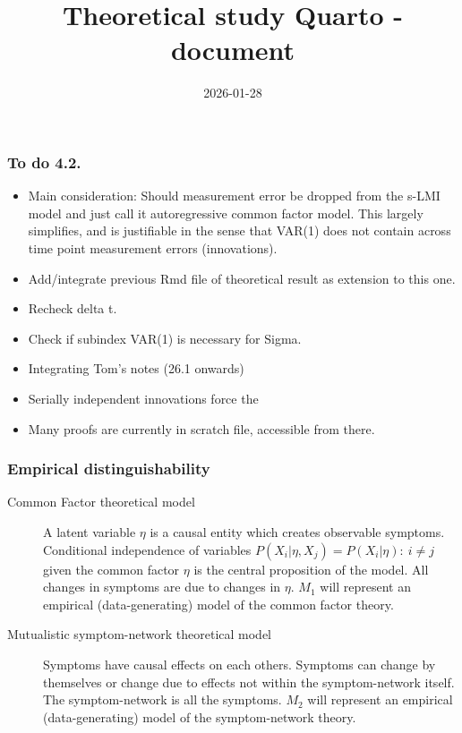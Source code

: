 \documentclass[
  letterpaper,
  DIV=11,
  numbers=noendperiod]{scrartcl}
\title{Theoretical study Quarto -document}
\author{}
\date{2026-01-28}
\begin{document}
\maketitle
\ifdefined\Shaded\renewenvironment{Shaded}{\begin{tcolorbox}[boxrule=0pt, enhanced, borderline west={3pt}{0pt}{shadecolor}, interior hidden, breakable, sharp corners, frame hidden]}{\end{tcolorbox}}\fi

\hypertarget{to-do-4.2.}{%
\subsubsection{To do 4.2.}\label{to-do-4.2.}}

\begin{itemize}
\item
  Main consideration: Should measurement error be dropped from the s-LMI
  model and just call it autoregressive common factor model. This
  largely simplifies, and is justifiable in the sense that VAR(1) does
  not contain across time point measurement errors (innovations).
\item
  Add/integrate previous Rmd file of theoretical result as extension to
  this one.
\item
  Recheck delta t.
\item
  Check if subindex VAR(1) is necessary for Sigma.
\item
  Integrating Tom's notes (26.1 onwards)
\item
  Serially independent innovations force the
\item
  Many proofs are currently in scratch file, accessible from there.
\end{itemize}

\hypertarget{empirical-distinguishability}{%
\subsubsection{Empirical
distinguishability}\label{empirical-distinguishability}}

\begin{description}
\item[Common Factor theoretical model]
A latent variable \(\eta\) is a causal entity which creates observable
symptoms. Conditional independence of variables
\(P(X_i|\eta,X_j)=P(X_i|\eta):\:i\ne j\) given the common factor
\(\eta\) is the central proposition of the model. All changes in
symptoms are due to changes in \(\eta\). \(M_1\) will represent an
empirical (data-generating) model of the common factor theory.
\item[Mutualistic symptom-network theoretical model]
Symptoms have causal effects on each others. Symptoms can change by
themselves or change due to effects not within the symptom-network
itself. The symptom-network is all the symptoms. \(M_2\) will represent
an empirical (data-generating) model of the symptom-network theory.
\end{description}
\end{document}

